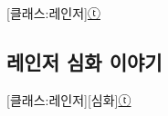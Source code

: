 \documentclass{report}
\begin{document}
	\begin{story}{}{[클래스:레인저]\hyperlink{celesteela}{ⓣ}}
		
	\end{story}
	
	\subsection{레인저 심화 이야기}
		\begin{story}{}{[클래스:레인저][심화]\hyperlink{celesteela}{ⓣ}}
			
		\end{story}
\end{document}
